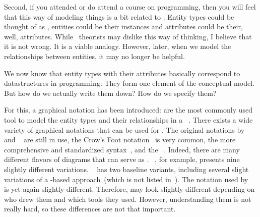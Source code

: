 Second, if you attended or do attend a course on programming, then you will feel that this way of modeling things is a bit related to .
Entity types could be thought of as , entities could be their instances and attributes could be their, well, attributes.
While \db\ theorists may dislike this way of thinking, I believe that it is not wrong.
It is a viable analogy.
However, later, when we model the relationships between entities, it may no longer be helpful.

We now know that entity types with their attributes basically correspond to datastructures in programming.
They form one element of the conceptual model.
But how do we actually write them down?
How do we specify them?

For this, a graphical notation has been introduced:
 are the most commonly used tool to model the entity types and their relationships in a \db~\cite{C2002ERMHEFTALL,C1975TRMTAUVOD,C1976TERMTAUVOD,KW2012ASHOTEDAIM,WF1995DHQDM,B1990CMERMO}.
There exists a wide variety of graphical notations that can be used for .
The original notations by \citeauthor{B1969DSD}~\cite{B1969DSD} and \citeauthor{C1975TRMTAUVOD}~\cite{C1975TRMTAUVOD,C1976TERMTAUVOD} are still in use, the Crow's Foot notation~\cite{E1976BDSMEWACE,CM2000MDMAUDA} is very common, the more comprehensive and standardized  syntax~\cite{FIPSPUB184,ISOIECIEEE2012ITMLP2SASFII}, and the ~\cite{OMG2017OUMLOU,RMHOSMUUIIIIOPPTRS1997UNG,BRJ1999TUMLRM}.
Indeed, there are many different flavors of diagrams that can serve as .
~\cite{S2024D:CDMERDE}, for example, presents nine slightly different variations.
~\cite{SS2005EIDDDFDB:CDDRAAML} has two baseline variants, including several slight variations of a -based approach~(which is not listed in~\cite{S2024D:CDMERDE}).
The notation used by \citeauthor{V1999C5DMS:CDUTERM}~\cite{V1999C5DMS:CDUTERM} is yet again slightly different.
Therefore,  may look slightly different depending on who drew them and which tools they used.
However, understanding them is not really hard, so these differences are not that important.

